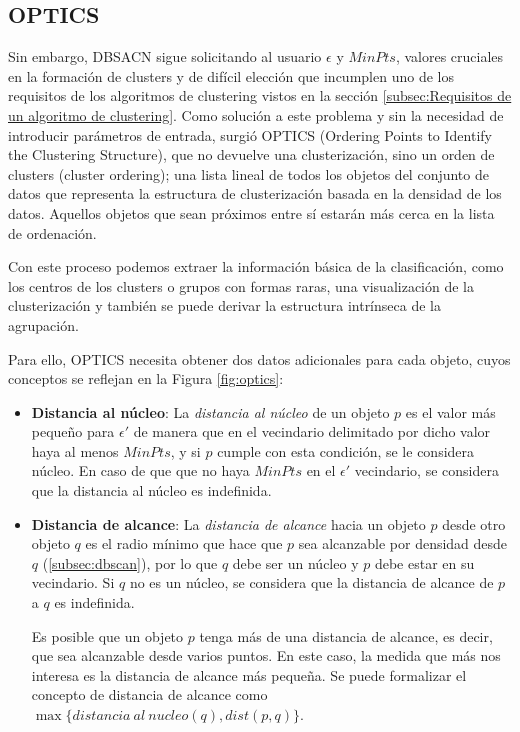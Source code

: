 \documentclass[10pt, a4paper]{article}
\begin{document}


\subsection{\textbf{OPTICS}} \label{subsec:optics}

Sin embargo, DBSACN sigue solicitando al usuario $\epsilon$ y $MinPts$, valores cruciales en la formación de clusters y de difícil elección que incumplen uno de los requisitos de los algoritmos de clustering vistos en la sección \ref{subsec:Requisitos de un algoritmo de clustering}. Como solución a este problema y sin la necesidad de introducir parámetros de entrada, surgió OPTICS (Ordering Points to Identify the Clustering Structure), que no devuelve una clusterización, sino un orden de clusters (cluster ordering); una lista lineal de todos los objetos del conjunto de datos que representa la estructura de clusterización basada en la densidad de los datos. Aquellos objetos que sean próximos entre sí estarán más cerca en la lista de ordenación.

Con este proceso podemos extraer la información básica de la clasificación, como los centros de los clusters o grupos con formas raras, una visualización de la clusterización y también se puede derivar la estructura intrínseca de la agrupación.

Para ello, OPTICS necesita obtener dos datos adicionales para cada objeto, cuyos conceptos se reflejan en la Figura \ref{fig:optics}:

\begin{itemize}
  \item \textbf{Distancia al núcleo}: La \textit{distancia al núcleo} de un objeto $p$ es el valor más pequeño para $\epsilon'$ de manera que en el vecindario delimitado por dicho valor haya al menos $MinPts$, y si $p$ cumple con esta condición, se le considera núcleo. En caso de que que no haya $MinPts$ en el $\epsilon'$ vecindario, se considera que la distancia al núcleo es indefinida.
  
  \item \textbf{Distancia de alcance}: La \textit{distancia de alcance} hacia un objeto $p$ desde otro objeto $q$ es el radio mínimo que hace que $p$ sea alcanzable por densidad desde $q$ (\ref{subsec:dbscan}), por lo que $q$ debe ser un núcleo y $p$ debe estar en su vecindario. Si $q$ no es un núcleo, se considera que la distancia de alcance de $p$ a $q$ es indefinida. 
  
  Es posible que un objeto $p$ tenga más de una distancia de alcance, es decir, que sea alcanzable desde varios puntos. En este caso, la medida que más nos interesa es la distancia de alcance más pequeña. Se puede formalizar el concepto de distancia de alcance como $\max\{distancia \ al \ nucleo(q), dist(p,q)\}$. 
\end{itemize}
\end{document}

